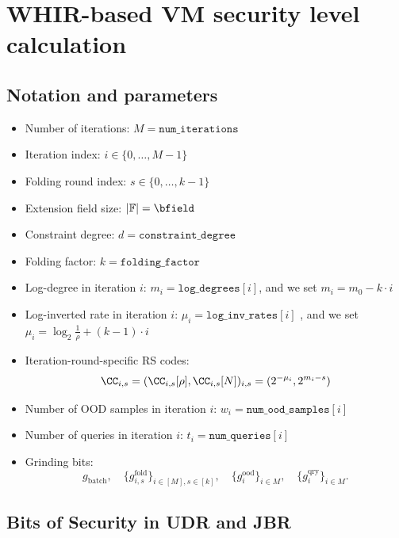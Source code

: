 \newpage

\section{WHIR-based VM security level calculation}\label{sec:whir_security_level}




\subsection{Notation and parameters}\label{sec:whir_notation}

\begin{itemize}
  \item Number of iterations: \(M = \texttt{num\_iterations}\)
  \item Iteration index: \(i \in \{0,\dots,M-1\}\)
  \item Folding round index: \(s \in \{0,\dots,k-1\}\)
  \item Extension field size: \(|\mathbb{F}| = \bfield\)
  \item Constraint degree: \(d = \texttt{constraint\_degree}\)
  \item Folding factor: \(k = \texttt{folding\_factor}\)
  \item Log-degree in iteration \(i\): \(m_i = \texttt{log\_degrees}[i]\), and we set $m_i = m_0-k\cdot i$
  \item Log-inverted rate in iteration \(i\): \(\mu_i = \texttt{log\_inv\_rates}[i]\) , and we set $\mu_i = \log_2 \frac{1}{\rho}+(k-1)\cdot i$
  \item Iteration-round-specific RS codes:
  $$
  \CC_{i,s}=(\CC_{i,s}[\rho],\CC_{i,s}[N])_{i,s}=(2^{-\mu_i},2^{m_i-s})
  $$
  \item Number of OOD samples in iteration \(i\): \(w_i = \texttt{num\_ood\_samples}[i]\)
  \item Number of queries in iteration \(i\): \(t_i = \texttt{num\_queries}[i]\)
  \item Grinding bits:
    \[
      g_{\mathrm{batch}},\quad
      \{g^{\mathrm{fold}}_{i,s}\}_{i\in [M],s\in[k]},\quad
      \{g^{\mathrm{ood}}_i\}_{i\in M},\quad
      \{g^{\mathrm{qry}}_i\}_{i\in M}.
    \]
\end{itemize}



\subsection{Bits of Security in UDR and JBR}

